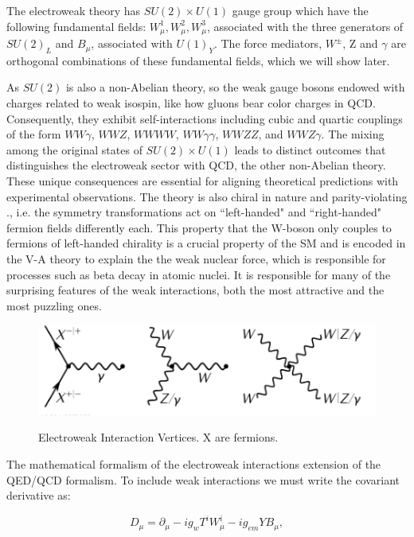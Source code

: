 The electroweak theory  has  $SU(2) \times U(1)$ gauge group which have the following fundamental fields: $W^1_{\mu}, W^2_{\mu}, W^3_{\mu}$, associated with the three generators of $SU(2)_{L}$ and $B_{\mu}$, associated with $U(1)_{Y}$. The force mediators, $W^{\pm}$, Z and $\gamma$ are orthogonal combinations of these fundamental fields, which we will show later.

As $SU(2)$ is also a non-Abelian theory, so the weak gauge bosons endowed with charges related to weak isospin, like how gluons bear color charges in QCD. Consequently, they exhibit self-interactions including cubic and quartic couplings of the form $WW\gamma$, $W W Z$, $W W W W$, $W W \gamma\gamma$, $W W ZZ$, and $W W Z\gamma$. The mixing among the original states of $SU(2) \times U(1)$ leads to distinct outcomes that distinguishes the electroweak sector with QCD, the other non-Abelian theory. These unique consequences are essential for aligning theoretical predictions with experimental observations. The theory is also chiral in nature and parity-violating  \cite{Kobayashi:1973fv}., i.e. the symmetry transformations act on ``left-handed" and ``right-handed" fermion fields differently each. This property that the W-boson only couples to fermions of left-handed chirality is a crucial property of the SM and is encoded in the V-A theory\cite{ParticleDataGroup:2018ovx} to explain the the weak nuclear force, which is responsible for processes such as beta decay in atomic nuclei. It is responsible for many of the surprising features of the weak interactions, both the most attractive and the most puzzling ones. 

\begin{figure}[!htbp]
	\centering
	\caption{Electroweak Interaction Vertices. X are fermions.}
    \includegraphics[scale=1.0]{fig/ElectroweakVertices.png}
	\label{fig:Electroweak}
\end{figure}

The mathematical formalism of the electroweak interactions extension of the QED/QCD formalism. To include weak interactions we must write the covariant derivative as:

\begin{equation}
    \label{eq:CovariantDerivativeElectroWeak}
    D_\mu = \partial_\mu - ig_wT^{i}W_{\mu}^{i} - ig_{em}YB_{\mu}, 
\end{equation}

